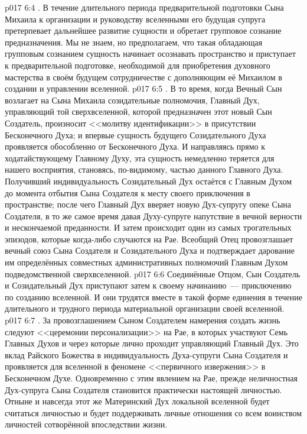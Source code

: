 \vs p017 6:4 . В течение длительного периода предварительной подготовки Сына Михаила к организации и руководству вселенными его будущая супруга претерпевает дальнейшее развитие сущности и обретает групповое сознание предназначения. Мы не знаем, но предполагаем, что такая обладающая групповым сознанием сущность начинает осознавать пространство и приступает к предварительной подготовке, необходимой для приобретения духовного мастерства в своём будущем сотрудничестве с дополняющим её Михаилом в создании и управлении вселенной.
\vs p017 6:5 . В то время, когда Вечный Сын возлагает на Сына Михаила созидательные полномочия, Главный Дух, управляющий той сверхвселенной, которой предназначен этот новый Сын Создатель, произносит <<молитву идентификации>> в присутствии Бесконечного Духа; и впервые сущность будущего Созидательного Духа проявляется обособленно от Бесконечного Духа. И направляясь прямо к ходатайствующему Главному Духу, эта сущность немедленно теряется для нашего восприятия, становясь, по\hyp{}видимому, частью данного Главного Духа. Получивший индивидуальность Созидательный Дух остаётся с Главным Духом до момента отбытия Сына Создателя к месту своего приключения в пространстве; после чего Главный Дух вверяет новую Дух\hyp{}супругу опеке Сына Создателя, в то же самое время давая Духу\hyp{}супруге напутствие в вечной верности и нескончаемой преданности. И затем происходит один из самых трогательных эпизодов, которые когда\hyp{}либо случаются на Рае. Всеобщий Отец провозглашает вечный союз Сына Создателя и Созидательного Духа и подтверждает дарование им определённых совместных административных полномочий Главным Духом подведомственной сверхвселенной.
\vs p017 6:6 Соединённые Отцом, Сын Создатель и Созидательный Дух приступают затем к своему начинанию~--- приключению по созданию вселенной. И они трудятся вместе в такой форме единения в течение длительного и трудного периода материальной организации своей вселенной.
\vs p017 6:7 . За провозглашением Сыном Создателем намерения создать жизнь следуют <<церемонии персонализации>> на Рае, в которых участвуют Семь Главных Духов и через которые лично проходит управляющий Главный Дух. Это вклад Райского Божества в индивидуальность Духа\hyp{}супруги Сына Создателя и проявляется для вселенной в феномене <<первичного извержения>> в Бесконечном Духе. Одновременно с этим явлением на Рае, прежде неличностная Дух\hyp{}супруга Сына Создателя становится практически настоящей личностью. Отныне и навсегда этот же Материнский Дух локальной вселенной будет считаться личностью и будет поддерживать личные отношения со всем воинством личностей сотворённой впоследствии жизни.
